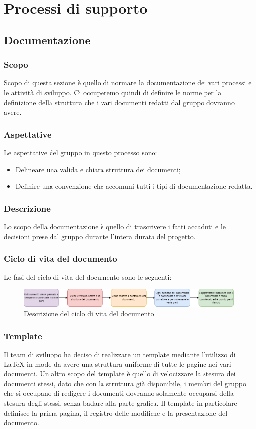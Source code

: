 \section{Processi di supporto}\label{section:processi_supporto}
\subsection{Documentazione}\label{subsection: documentazione}
\subsubsection{Scopo}\label{subsubsection: scopo}
Scopo di questa sezione è quello di normare la documentazione dei vari processi e le attività di sviluppo.
Ci occuperemo quindi di definire le norme per la definizione della struttura che i vari documenti redatti dal gruppo \groupName{} dovranno avere.
\subsubsection{Aspettative}
Le aspettative del gruppo \groupName{} in questo processo sono:
\begin{itemize}
\item Delineare una valida e chiara struttura dei documenti;
\item Definire una convenzione che accomuni tutti i tipi di documentazione redatta.
\end {itemize}
\subsubsection{Descrizione}
Lo scopo della documentazione è quello di trascrivere i fatti accaduti e le decisioni prese dal gruppo durante l'intera durata del progetto.
\subsubsection{Ciclo di vita del documento}
Le fasi del ciclo di vita del documento sono le seguenti:
\begin{figure}[htbp]
\centering
\includegraphics[scale = 0.5]{../template/images/NdP/CicloDiVitaDocumento.png}
\caption{Descrizione del ciclo di vita del documento}
\end {figure}
\subsubsection{Template}
Il team di sviluppo ha deciso di realizzare un template mediante l'utilizzo di \LaTeX{} in modo da avere una struttura uniforme di tutte le pagine nei vari documenti.
Un altro scopo del template è quello di velocizzare la stesura dei documenti stessi, dato che con la struttura già disponibile, i membri del gruppo che si occupano di redigere i documenti dovranno solamente occuparsi della stesura degli stessi, senza badare alla parte grafica.
Il template in particolare definisce la prima pagina, il registro delle modifiche e la presentazione del documento.

